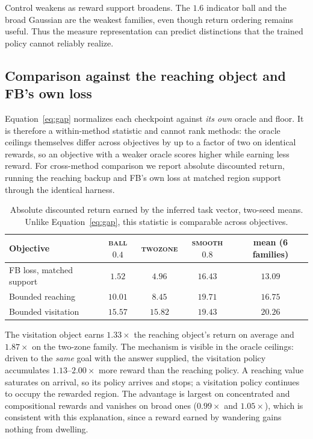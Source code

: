 \documentclass{article}
\begin{document}
Control weakens as reward support broadens. The $1.6$ indicator ball and the broad
Gaussian are the weakest families, even though return ordering remains useful.
Thus the measure representation can predict distinctions that the trained policy
cannot reliably realize.

\subsection{Comparison against the reaching object and FB's own loss}
\label{sec:cross-method}

Equation~\ref{eq:gap} normalizes each checkpoint against \emph{its own} oracle and
floor. It is therefore a within-method statistic and cannot rank methods: the
oracle ceilings themselves differ across objectives by up to a factor of two on
identical rewards, so an objective with a weaker oracle scores higher while
earning less reward. For cross-method comparison we report absolute discounted
return, running the reaching backup and FB's own loss at matched region support
through the identical harness.

\begin{table}[t]
\centering\small
\begin{tabular}{l c c c c}
\toprule
Objective & \textsc{ball} $0.4$ & \textsc{twozone} & \textsc{smooth} $0.8$ & mean (6 families) \\
\midrule
FB loss, matched support & $1.52$ & $4.96$ & $16.43$ & $13.09$ \\
Bounded reaching         & $10.01$ & $8.45$ & $\mathbf{19.71}$ & $16.75$ \\
Bounded visitation       & $\mathbf{15.57}$ & $\mathbf{15.82}$ & $19.43$ & $\mathbf{20.26}$ \\
\bottomrule
\end{tabular}
\caption{Absolute discounted return earned by the inferred task vector, two-seed
means. Unlike Equation~\ref{eq:gap}, this statistic is comparable across
objectives.}
\label{tab:crossmethod}
\end{table}

The visitation object earns $1.33\times$ the reaching object's return on average
and $1.87\times$ on the two-zone family. The mechanism is visible in the oracle
ceilings: driven to the \emph{same} goal with the answer supplied, the visitation
policy accumulates $1.13$--$2.00\times$ more reward than the reaching policy. A
reaching value saturates on arrival, so its policy arrives and stops; a visitation
policy continues to occupy the rewarded region. The advantage is largest on
concentrated and compositional rewards and vanishes on broad ones ($0.99\times$
and $1.05\times$), which is consistent with this explanation, since a reward
earned by wandering gains nothing from dwelling.
\end{document}
